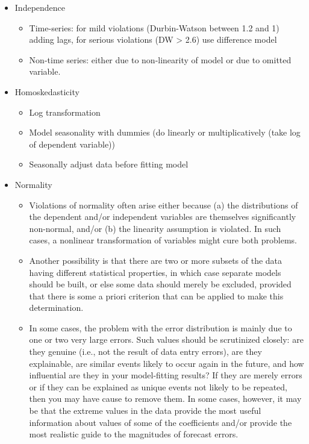 \documentclass[
  letterpaper,
  DIV=11,
  numbers=noendperiod]{scrreprt}
\providecommand{\tightlist}{%
  \setlength{\itemsep}{0pt}\setlength{\parskip}{0pt}}\usepackage{longtable,booktabs,array}
\begin{document}
\begin{itemize}
\item
  Independence

  \begin{itemize}
  \item
    Time-series: for mild violations (Durbin-Watson between 1.2 and 1)
    adding lags, for serious violations (DW \textgreater{} 2.6) use
    difference model
  \item
    Non-time series: either due to non-linearity of model or due to
    omitted variable.
  \end{itemize}
\item
  Homoskedasticity

  \begin{itemize}
  \tightlist
  \item
    Log transformation
  \item
    Model seasonality with dummies (do linearly or multiplicatively
    (take log of dependent variable))
  \item
    Seasonally adjust data before fitting model
  \end{itemize}
\item
  Normality

  \begin{itemize}
  \item
    Violations of normality often arise either because (a) the
    distributions of the dependent and/or independent variables are
    themselves significantly non-normal, and/or (b) the linearity
    assumption is violated. In such cases, a nonlinear transformation of
    variables might cure both problems.
  \item
    Another possibility is that there are two or more subsets of the
    data having different statistical properties, in which case separate
    models should be built, or else some data should merely be excluded,
    provided that there is some a priori criterion that can be applied
    to make this determination.
  \item
    In some cases, the problem with the error distribution is mainly due
    to one or two very large errors. Such values should be scrutinized
    closely: are they genuine (i.e., not the result of data entry
    errors), are they explainable, are similar events likely to occur
    again in the future, and how influential are they in your
    model-fitting results? If they are merely errors or if they can be
    explained as unique events not likely to be repeated, then you may
    have cause to remove them. In some cases, however, it may be that
    the extreme values in the data provide the most useful information
    about values of some of the coefficients and/or provide the most
    realistic guide to the magnitudes of forecast errors.
  \end{itemize}
\end{itemize}
\end{document}
